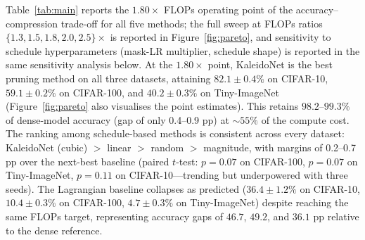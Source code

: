 \documentclass[fleqn,10pt]{article}
\begin{document}
Table~\ref{tab:main} reports the $1.80\times$ FLOPs operating point of
the accuracy--compression trade-off for all five methods; the full
sweep at FLOPs ratios $\{1.3, 1.5, 1.8, 2.0, 2.5\}\times$ is reported
in Figure~\ref{fig:pareto}, and
sensitivity to schedule hyperparameters (mask-LR multiplier, schedule
shape) is reported in the same sensitivity analysis below. At the
$1.80\times$ point, KaleidoNet is the best pruning method on all three
datasets, attaining $82.1\pm0.4\%$ on CIFAR-10, $59.1\pm0.2\%$ on
CIFAR-100, and $40.2\pm0.3\%$ on Tiny-ImageNet (Figure~\ref{fig:pareto}
also visualises the point estimates). This retains $98.2$--$99.3\%$ of
dense-model accuracy (gap of only 0.4--0.9 pp) at ${\sim}55\%$ of the
compute cost. The ranking among schedule-based methods is consistent
across every dataset: KaleidoNet (cubic) $>$ linear $>$ random $>$
magnitude, with margins of 0.2--0.7 pp over the next-best baseline
(paired $t$-test: $p{=}0.07$ on CIFAR-100, $p{=}0.07$ on
Tiny-ImageNet, $p{=}0.11$ on CIFAR-10---trending but underpowered
with three seeds). The Lagrangian baseline collapses as predicted
($36.4\pm1.2\%$ on CIFAR-10, $10.4\pm0.3\%$ on CIFAR-100,
$4.7\pm0.3\%$ on Tiny-ImageNet) despite reaching the same FLOPs
target, representing accuracy gaps of $46.7$, $49.2$, and $36.1$ pp
relative to the dense reference.
\end{document}

